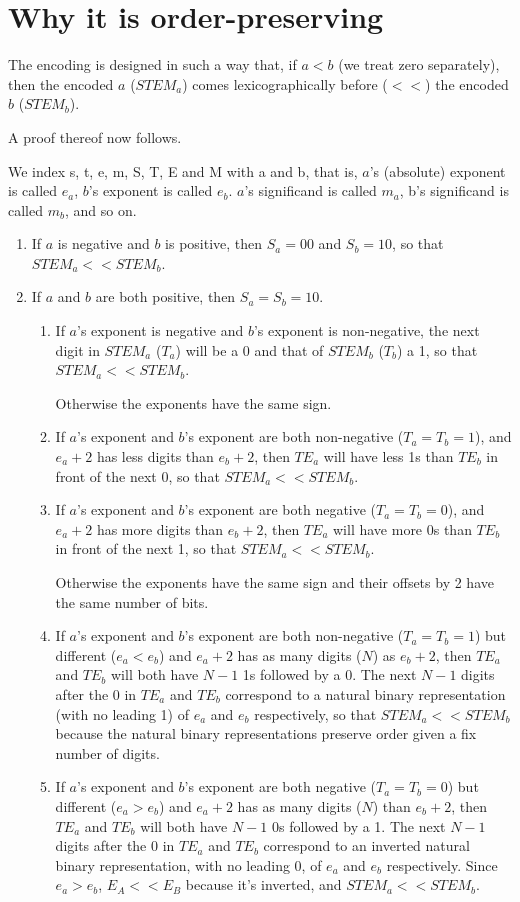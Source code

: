 \documentclass{acm_proc_article-sp}
\begin{document}
\section{Why it is order-preserving}
\label{section-proof}

The encoding is designed in such a way that, if $a < b$ (we treat zero separately), then the encoded $a$ ($STEM_a$) comes lexicographically before ($<<$) the encoded $b$ ($STEM_b$).

A proof thereof now follows.

We index s, t, e, m, S, T, E and M with a and b, that is, $a$'s (absolute) exponent is called $e_a$, $b$'s exponent is called $e_b$. $a$'s significand is called $m_a$, b's significand is called $m_b$, and so on.
 
\begin{enumerate}
\item If $a$ is negative and $b$ is positive, then $S_a=00$ and $S_b=10$, so that $STEM_a << STEM_b$.
\item If $a$ and $b$ are both positive, then $S_a=S_b=10$.
\begin{enumerate}
  \item If $a$'s exponent is negative and $b$'s exponent is non-negative, the next digit in $STEM_a$ ($T_a$) will be a 0 and that of $STEM_b$ ($T_b$) a 1, so that $STEM_a<< STEM_b$.

  Otherwise the exponents have the same sign.
  \item If $a$'s exponent and $b$'s exponent are both non-negative ($T_a=T_b=1$), and $e_a+2$ has less digits than $e_b+2$, then $TE_a$ will have less 1s than $TE_b$ in front of the next 0, so that $STEM_a << STEM_b$.
  \item If $a$'s exponent and $b$'s exponent are both negative ($T_a=T_b=0$), and $e_a+2$ has more digits than $e_b+2$, then $TE_a$ will have more 0s than $TE_b$ in front of the next 1, so that $STEM_a << STEM_b$.

  Otherwise the exponents have the same sign and their offsets by 2 have the same number of bits.
  \item If $a$'s exponent and $b$'s exponent are both non-negative ($T_a=T_b=1$) but different ($e_a < e_b$) and $e_a+2$ has as many digits ($N$) as $e_b+2$, then $TE_a$ and $TE_b$ will both have $N-1$ 1s followed by a 0. The next $N-1$ digits after the 0 in $TE_a$ and $TE_b$ correspond to a natural binary representation (with no leading 1) of $e_a$ and $e_b$ respectively, so that $STEM_a << STEM_b$ because the natural binary representations preserve order given a fix number of digits.
  \item If $a$'s exponent and $b$'s exponent are both negative ($T_a=T_b=0$) but different ($e_a > e_b$) and $e_a+2$ has as many digits ($N$) than $e_b+2$, then $TE_a$ and $TE_b$ will both have $N-1$ 0s followed by a 1. The next $N-1$ digits after the 0 in $TE_a$ and $TE_b$ correspond to an inverted natural binary representation, with no leading 0, of $e_a$ and $e_b$ respectively. Since $e_a > e_b$, $E_A << E_B$ because it's inverted, and $STEM_a << STEM_b$.


\end{enumerate}
\end{enumerate}
\end{document}
